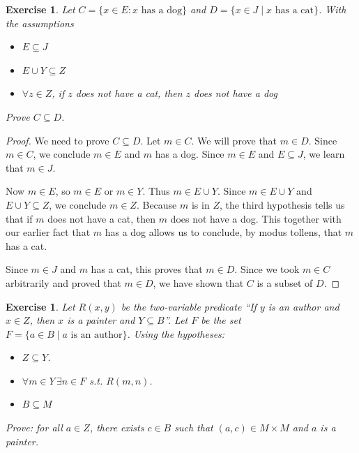 \documentclass{book}
\newcounter{ekcounter}%
\theoremstyle{ekimcustom}
\newtheorem{exercise}[ekcounter]{Exercise}
\begin{document}
\begin{exercise}
Let $C = \{x \in E : x\text{ has a dog}\}$ and $D = \{x \in J \mid x\text{ has a cat}\}$. With the assumptions
\begin{itemize}
\item $E \subseteq J$
\item $E \cup Y \subseteq Z$
\item $\forall z \in Z$, if $z$ does not have a cat, then $z$ does not have a dog
\end{itemize}
Prove $C \subseteq D$. %
\end{exercise}
\begin{proof}
We need to prove $C \subseteq D$. Let $m \in C$. We will prove that $m \in D$. Since $m \in C$, we conclude $m \in E$ and $m$ has a dog. Since $m \in E$ and $E \subseteq J$, we learn that $m \in J$.

Now $m \in E$, so $m \in E$ or $m \in Y$. Thus $m \in E \cup Y$. Since $m \in E \cup Y$ and $E \cup Y \subseteq Z$, we conclude $m \in Z$. Because $m$ is in $Z$, the third hypothesis tells us that if $m$ does not have a cat, then $m$ does not have a dog. This together with our earlier fact that $m$ has a dog allows us to conclude, by modus tollens, that $m$ has a cat.

Since $m \in J$ and $m$ has a cat, this proves that $m \in D$. Since we took $m \in C$ arbitrarily and proved that $m \in D$, we have shown that $C$ is a subset of $D$.
\end{proof}

\begin{exercise}
Let $R(x,y)$ be the two-variable predicate ``If $y$ is an author and $x \in Z$, then $x$ is a painter and $Y \subseteq B$''. Let $F$ be the set $F = \{a \in B \mid a \text{ is an author}\}$. Using the hypotheses:
\begin{itemize}
\item $Z \subseteq Y$.
\item $\forall m \in Y\,\exists n \in F$ s.t. $R(m,n)$.
\item $B \subseteq M$
\end{itemize}
Prove: for all $a \in Z$, there exists $c \in B$ such that $(a,c) \in M \times M$ and $a$ is a painter.
\end{exercise}
\end{document}
